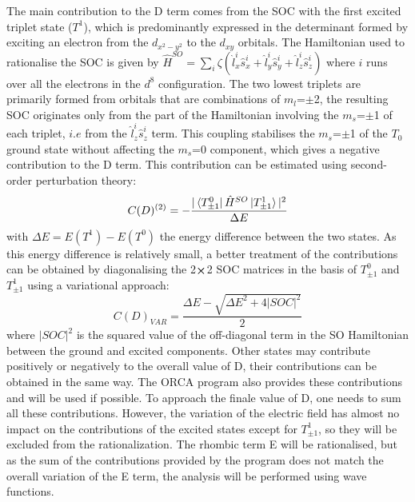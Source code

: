 \documentclass[10pt]{report}
\numberwithin{equation}{section}
\begin{document}
The main contribution to the D term comes from the SOC with the first excited triplet state ($T^1$), which is predominantly expressed in the determinant formed by exciting an electron from the $d_{x^2-y^2}$ to the $d_{xy}$ orbitals.
The Hamiltonian used to rationalise the SOC is given by $\hat{H}^{SO}=\sum_{i} \zeta(\hat{l}_x^i\hat{s}_x^i+\hat{l}_y^i\hat{s}_y^i+\hat{l}_z^i\hat{s}_z^i)$ where $i$ runs over all the electrons in the $d^8$ configuration.
The two lowest triplets are primarily formed from orbitals that are combinations of $m_l$=$\pm$2, the resulting SOC originates only from the part of the Hamiltonian involving the $m_s$=$\pm$1 of each triplet, $i.e$ from the $\hat{l}_z^i\hat{s}_z^i$ term.
This coupling stabilises the $m_s$=$\pm$1 of the $T_0$ ground state without affecting the $m_s$=0 component, which gives a negative contribution to the D term.
This contribution can be estimated using second-order perturbation theory:
\begin{equation}\label{ContrPert}
    C(D)^{(2)}=-\frac{|\bra{T^0_{\pm1}}\hat{H}^{SO}\ket{T^1_{\pm1}}|^2}{\Delta E}
\end{equation}
with $\Delta E = E(T^1)-E(T^0)$ the energy difference between the two states.
As this energy difference is relatively small, a better treatment of the contributions can be obtained by diagonalising the 2$\cross$2 SOC matrices in the basis of $T^0_{\pm1}$ and $T^1_{\pm1}$ using a variational approach:
\begin{equation}
    C(D)_{VAR}=\frac{\Delta E -\sqrt{\Delta E^2+4|SOC|^2}}{2}
\end{equation}
where $|SOC|^2$ is the squared value of the off-diagonal term in the SO Hamiltonian between the ground and excited components.
Other states may contribute positively or negatively to the overall value of D, their contributions can be obtained in the same way. 
The ORCA program also provides these contributions and will be used if possible. To approach the finale value of D, one needs to sum all these contributions.
However, the variation of the electric field has almost no impact on the contributions of the excited states except for $T^1_{\pm1}$, so they will be excluded from the rationalization.
The rhombic term E will be rationalised, but as the sum of the contributions provided by the program does not match the overall variation of the E term, the analysis will be performed using wave functions.
\end{document}
